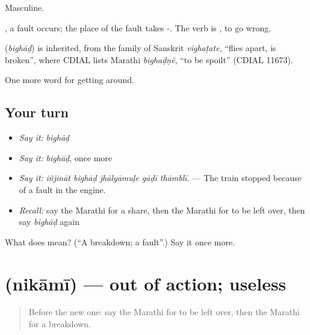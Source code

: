 Masculine.

 , a fault occurs; the place of the fault takes -. The verb is , to go wrong.

\begin{cousinweb}
\textbf{} (\emph{bighāḍ}) is inherited, from the family of Sanskrit \emph{vighaṭate}, \textquotedblleft{}flies apart, is broken\textquotedblright{}, where CDIAL lists Marathi \emph{bighaḍṇẽ}, \textquotedblleft{}to be spoilt\textquotedblright{} (CDIAL 11673).
\end{cousinweb}

\begin{grammarlens}[title={What you've built}]
One more word for getting around.
\end{grammarlens}

\subsection*{Your turn}
\begin{itemize}
\raggedright
  \item \emph{Say it:} \emph{bighāḍ}
  \item \emph{Say it:} \emph{bighāḍ}, once more
  \item \emph{Say it:} \emph{iñjināt bighāḍ jhālyāmuḷe gāḍī thāmblī.} — The train stopped because of a fault in the engine.
  \item \emph{Recall:} say the Marathi for a share, then the Marathi for to be left over, then say \emph{bighāḍ} again
\end{itemize}

\begin{tcolorbox}[breakable,colback=teal!4,colframe=teal!35!black,title={Before you move on}]
What does  mean? (\textquotedblleft{}A breakdown; a fault\textquotedblright{}.) Say it once more.
\end{tcolorbox}
\section[\texorpdfstring{\mr{निकामी} (nikāmī)}{निकामी (nikāmī)}]{ (nikāmī) — out of action; useless}

\label{lesson:MR-C431-nikami}



\begin{quote}
Before the new one: say the Marathi for to be left over, then the Marathi for a breakdown.
\end{quote}


